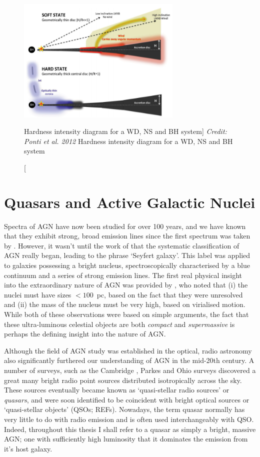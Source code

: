 \begin{figure}
\centering
\includegraphics[width=0.7\textwidth]{figures/01-intro/ponti_wind_cartoon.png}
\caption
[Hardness intensity diagram for a WD, NS and BH system]
{
{\sl Credit: Ponti et al. 2012}
Hardness intensity diagram for a WD, NS and BH system
} 
\label{fig:ponti_cartoon}
\end{figure}


\section{Quasars and Active Galactic Nuclei}

Spectra of AGN have now been studied for over 100 years, and we have known 
that they exhibit strong, broad emission lines since the first spectrum was taken by
\cite{fath1909}.
However, it wasn't until the work of \cite{seyfert1943} that the systematic 
classification of AGN really began, leading to the phrase `Seyfert galaxy'.
This label was applied to galaxies possessing a bright nucleus, spectroscopically
characterised by a blue continuum and a series of strong emission lines.
The first real physical insight into the extraordinary nature of AGN
was provided by \cite{woltjer1959}, who noted that (i) the nuclei must have sizes $<100$~pc,
based on the fact that they were unresolved and (ii) the mass of the nucleus
must be very high, based on virialised motion. 
While both of these observations were based on simple arguments, the fact that these
ultra-luminous celestial objects are both {\em compact} and {\em supermassive}
is perhaps the defining insight into the nature of AGN.

Although the field of AGN study was established in the optical, 
radio astronomy also significantly furthered our understanding of AGN
in the mid-20th century. A number of surveys, such as the Cambridge \citep{edge1959}, 
Parkes \citep{ekers1969} and Ohio \citep{ehman1970} surveys discovered a great many 
bright radio point sources distributed isotropically across the sky.
These sources eventually became known as `quasi-stellar radio sources'
or {\em quasars}, and were soon identified to be coincident with bright optical
sources or `quasi-stellar objects' (QSOs; REFs). 
Nowadays, the term quasar normally has very little to do with 
radio emission and is often used interchangeably with QSO. 
Indeed, throughout this thesis I shall refer to a quasar as simply a bright, 
massive AGN; one with sufficiently high luminosity that it dominates the emission 
from it's host galaxy. 

